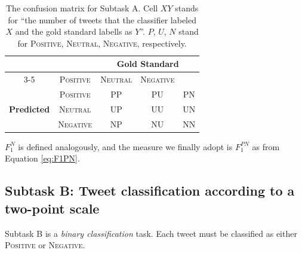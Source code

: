 \documentclass[11pt,letterpaper]{article}
\begin{document}
\renewcommand{\tabcolsep}{0.1cm} \renewcommand{\arraystretch}{1.30}
\begin{table}[tbh]
  \begin{center}
    \resizebox{\columnwidth}{!} {
    \begin{tabular}{|c|c||c|c|c|}
      \hline
      \multicolumn{2}{|c||}{\mbox{}} & \multicolumn{3}{c|}{\bf Gold Standard} \\
      \cline{3-5}
      \multicolumn{2}{|c||}{\mbox{}} & \textsc{Positive} & \textsc{Neutral} & \textsc{Negative} \\
      \hline\hline
      \multirow{3}{*}{\begin{sideways}\bf Predicted\end{sideways}} & \textsc{Positive} & PP & PU & PN \\
      \cline{2-5}
      & \textsc{Neutral} & UP & UU & UN \\
      \cline{2-5}
      & \textsc{Negative} & NP & NU & NN \\
      \hline
    \end{tabular}
    }
\caption{
\label{tab:threewaycontingencytable} The confusion matrix for Subtask
A. Cell $XY$ stands for ``the number of tweets that the classifier labeled $X$
and the gold standard labells as $Y$''. $P$, $U$, $N$ stand for
\textsc{Positive}, \textsc{Neutral}, \textsc{Negative}, respectively.}
\end{center}
\end{table}%
%
$F_{1}^{N}$ is defined analogously, and the measure we finally adopt
is $F_{1}^{PN}$ as from Equation \ref{eq:F1PN}.



\subsection{Subtask B: Tweet classification according to a two-point
scale}
\label{sec:4B}

\noindent Subtask B is a \emph{binary classification} task. Each tweet must be classified as either \textsc{Positive} or \textsc{Negative}.

\end{document}
